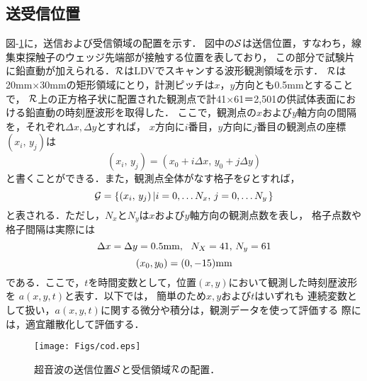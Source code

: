 \subsection{送受信位置}
図-\ref{fig:fig4}に，送信および受信領域の配置を示す．
図中の${\cal S}$は送信位置，すなわち，線集束探触子のウェッジ先端部が接触する位置を表しており，
この部分で試験片に鉛直動が加えられる．${\cal R}$はLDVでスキャンする波形観測領域を示す．
$\cal R$は20mm$\times$30mmの矩形領域にとり，計測ピッチは$x$，$y$方向とも0.5mmとすることで，
$\cal R$上の正方格子状に配置された観測点で計41×61＝2,501の供試体表面における鉛直動の時刻歴波形を取得した．
ここで，観測点の$x$および$y$軸方向の間隔を，それぞれ$\Delta x,\Delta y$とすれば，
$x$方向に$i$番目，$y$方向に$j$番目の観測点の座標$(x_i,\, y_j)$は
\begin{equation}
	(x_i,\, y_j)=(x_0+i\Delta x,\, y_0+j\Delta y)
	\label{eqn:x_ij}
\end{equation}
と書くことができる．また，観測点全体がなす格子を${\cal G}$とすれば，
\begin{equation}
	{\cal G} = \left\{ 
	(x_i,\, y_j)\left| i=0,\dots N_x, \, j=0,\dots N_y  \right.
	\right\}
	\label{eqn:Grid}
\end{equation}
と表される．ただし，$N_x$と$N_y$は$x$および$y$軸方向の観測点数を表し，
格子点数や格子間隔は実際には
\begin{equation}
	\Delta x=\Delta y=0.5 {\rm mm}, \ \ N_X=41, \, N_y=61
	\label{eqn:grid_prms}
\end{equation}
\begin{equation}
	(x_0,y_0)=(0,-15){\rm mm}
	\label{eqn:grid_corner}
\end{equation}
である．ここで，$t$を時間変数として，位置$(x,y)$において観測した時刻歴波形を
$a(x,y,t)$と表す．以下では， 簡単のため$x,y$および$t$はいずれも
連続変数として扱い，$a(x,y,t)$に関する微分や積分は，観測データを使って評価する
際には，適宜離散化して評価する．
\begin{figure}[t]
\begin{center}
\texttt{[image: Figs/cod.eps]}
\caption{
	超音波の送信位置$\cal S$と受信領域$\cal R$の配置．
}
\label{fig:fig4}
\end{center}
\end{figure}
